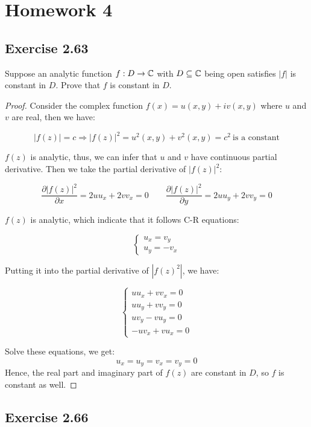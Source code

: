 \documentclass{article}
\begin{document}
\section{Homework 4}

\subsection{Exercise 2.63}

Suppose an analytic function $f : D \to \mathbb{C}$ with $D \subseteq \mathbb{C}$
being open satisfies $|f|$ is constant in $D$. Prove that $f$ is
constant in $D$.

\begin{proof}
  Consider the complex function $f(x) = u(x,y) + iv(x,y)$ where $u$
  and $v$ are real, then we have:

  \[
    |f(z)| = c \Rightarrow |f(z)|^2 = u^2(x,y) + v^2(x,y) = c^2 \
    \text{is a constant}
  \]

  $f(z)$ is analytic, thus, we can infer that $u$ and $v$ have
  continuous partial derivative. Then we take the partial derivative
  of $|f(z)|^2$:

  \[
    \frac{\partial |f(z)|^2}{\partial x} = 2uu_x+2vv_x = 0 \qquad
    \frac{\partial |f(z)|^2}{\partial y} = 2uu_y+2vv_y = 0
  \]

  $f(z)$ is analytic, which indicate that it follows C-R equations:

  \[
    \begin{cases}
      u_x = v_y \\
      u_y = -v_x
    \end{cases}
  \]

  Putting it into the partial derivative of $|f(z)^2|$, we have:

  \[
    \begin{cases}
      uu_x + vv_x = 0 \\
      uu_y + vv_y = 0 \\
      uv_y - vu_y = 0 \\
      -uv_x + vu_x = 0
    \end{cases}
  \]

  Solve these equations, we get:
  \[
    u_x = u_y = v_x = v_y = 0
  \]
  Hence, the real part and imaginary part of $f(z)$ are constant in
  $D$, so $f$ is constant as well.
\end{proof}

\subsection{Exercise 2.66}
\end{document}
